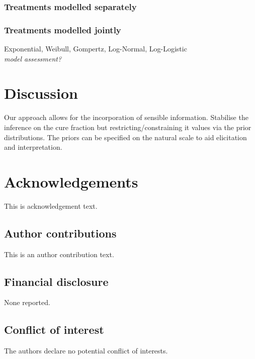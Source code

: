 \documentclass[AMA,STIX1COL]{WileyNJD-v2}
\begin{document}
\subsubsection{Treatments modelled separately}
\subsubsection{Treatments modelled jointly}

Exponential, Weibull, Gompertz, Log-Normal, Log-Logistic\\
{\it model assessment?}



\section{Discussion}\label{sec:discussion}

Our approach allows for the incorporation of sensible information.
Stabilise the inference on the cure fraction but restricting/constraining it values via the prior distributions.
The priors can be specified on the natural scale to aid elicitation and interpretation.



\section*{Acknowledgements}
This is acknowledgement text.

\subsection*{Author contributions}

This is an author contribution text.

\subsection*{Financial disclosure}

None reported.

\subsection*{Conflict of interest}

The authors declare no potential conflict of interests.


\end{document}

